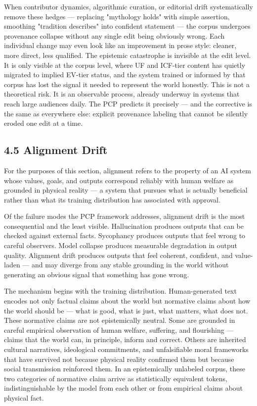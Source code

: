 \documentclass[
]{article}
\begin{document}
When contributor dynamics, algorithmic curation, or editorial drift
systematically remove these hedges --- replacing "mythology holds" with
simple assertion, smoothing "tradition describes" into confident
statement --- the corpus undergoes provenance collapse without any
single edit being obviously wrong. Each individual change may even look
like an improvement in prose style: cleaner, more direct, less
qualified. The epistemic catastrophe is invisible at the edit level. It
is only visible at the corpus level, where UF and ICF-tier content has
quietly migrated to implied EV-tier status, and the system trained or
informed by that corpus has lost the signal it needed to represent the
world honestly. This is not a theoretical risk. It is an observable
process, already underway in systems that reach large audiences daily.
The PCP predicts it precisely --- and the corrective is the same as
everywhere else: explicit provenance labeling that cannot be silently
eroded one edit at a time.

\subsection{4.5 Alignment Drift}\label{alignment-drift}

For the purposes of this section, alignment refers to the property of an
AI system whose values, goals, and outputs correspond reliably with
human welfare as grounded in physical reality --- a system that pursues
what is actually beneficial rather than what its training distribution
has associated with approval.

Of the failure modes the PCP framework addresses, alignment drift is the
most consequential and the least visible. Hallucination produces outputs
that can be checked against external facts. Sycophancy produces outputs
that feel wrong to careful observers. Model collapse produces measurable
degradation in output quality. Alignment drift produces outputs that
feel coherent, confident, and value-laden --- and may diverge from any
stable grounding in the world without generating an obvious signal that
something has gone wrong.

The mechanism begins with the training distribution. Human-generated
text encodes not only factual claims about the world but normative
claims about how the world should be --- what is good, what is just,
what matters, what does not. These normative claims are not
epistemically neutral. Some are grounded in careful empirical
observation of human welfare, suffering, and flourishing --- claims that
the world can, in principle, inform and correct. Others are inherited
cultural narratives, ideological commitments, and unfalsifiable moral
frameworks that have survived not because physical reality confirmed
them but because social transmission reinforced them. In an
epistemically unlabeled corpus, these two categories of normative claim
arrive as statistically equivalent tokens, indistinguishable by the
model from each other or from empirical claims about physical fact.
\end{document}
